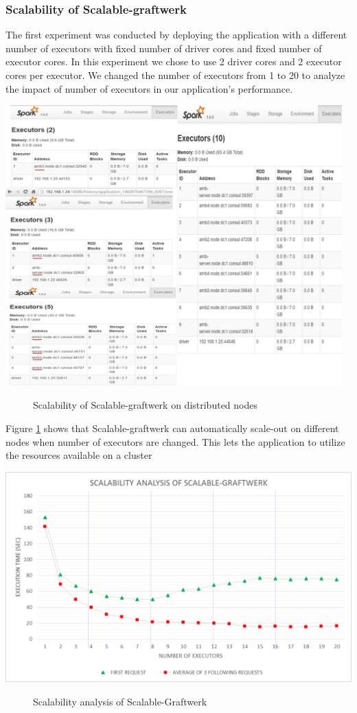 \subsubsection{\textbf{Scalability of Scalable-graftwerk}}
\label{scalability-exp}
The first experiment was conducted by deploying the application with a different number of executors with fixed number of driver cores and fixed number of executor cores. In this experiment we chose to use 2 driver cores and 2 executor cores per executor. We changed the number of executors from 1 to 20 to analyze the impact of number of executors in our application's performance. 
\begin{center}
	\includegraphics[width=35em]{./Figures/scale}
	\begin{figure}[htbp]
    \caption{Scalability of Scalable-graftwerk on distributed nodes}
    \label{fig:scale}
	\end{figure}
\end{center}
Figure \ref{fig:scale} shows that Scalable-graftwerk can automatically scale-out on different nodes when number of executors are changed. This lets the application to utilize the resources available on a cluster
\begin{center}
	\includegraphics[width=38em]{./Figures/executors2}
	\begin{figure}[htbp]
    \caption{Scalability analysis of Scalable-Graftwerk}
    \label{fig:executors}
	\end{figure}
\end{center}
